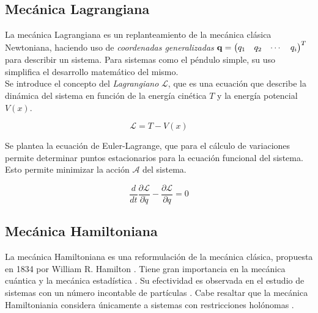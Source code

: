 \subsection{Mecánica Lagrangiana}

La mecánica Lagrangiana es un replanteamiento de la 
mecánica clásica Newtoniana, haciendo uso
de \emph{coordenadas generalizadas}
$\bold{q} = 
\begin{pmatrix}
q_1 & q_2 &\cdots & q_i
\end{pmatrix}^T
$ para describir un sistema.
Para sistemas como el péndulo simple, su uso simplifica el
desarrollo matemático del mismo.\\

Se introduce el concepto del \emph{Lagrangiano} $\mathcal{L}$,
que es una ecuación que describe la dinámica del sistema en 
función de la energía cinética $T$ y la energía potencial $V(x)$.

\begin{equation}
 \mathcal{L} = T - V(x)
 \label{eq: lagrangian}
\end{equation}

Se plantea la ecuación de Euler-Lagrange, 
que para el cálculo de variaciones permite determinar
puntos estacionarios para la ecuación funcional del sistema.
Esto permite minimizar la acción $\mathcal{A}$ del sistema.

\begin{equation}
 \dfrac{d}{dt} \dfrac{\partial \mathcal{L}}{\partial \dot{q}} - 
 \dfrac{\partial \mathcal{L}}{\partial q} = 0
 \label{eq: euler lagrange equation}
\end{equation}



\subsection{Mecánica Hamiltoniana}

La mecánica Hamiltoniana es una reformulación de la mecánica clásica, 
propuesta en 1834 por William R. Hamilton \cite{hamilton1834general}.
Tiene gran importancia en la mecánica cuántica y la mecánica estadística \cite{Montague:399399}.
Su efectividad es observada en el estudio de sistemas con un número
incontable de partículas \cite{morin2008introduction}. 
Cabe resaltar que la mecánica Hamiltoniania considera únicamente a 
sistemas con restricciones holónomas \cite{morin2008introduction}.


